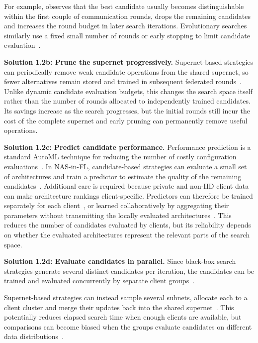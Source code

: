 For example, \cite{decnas_2022,fednas_over_hetero_mobile_devices_2022} observes that the best candidate usually becomes distinguishable within the first couple of communication rounds, drops the remaining candidates and increases the round budget in later search iterations. Evolutionary searches similarly use a fixed small number of rounds or early stopping to limit candidate evaluation~\cite{multi_objective_evo_fl_2020,gpt4-boosted_pso_fednas_2024}.

\noindent\textbf{Solution 1.2b: Prune the supernet progressively.} Supernet-based strategies can periodically remove weak candidate operations from the shared supernet, so fewer alternatives remain stored and trained in subsequent federated rounds~\cite{dfnas_2020,peaches_2024}. Unlike dynamic candidate evaluation budgets, this changes the search space itself rather than the number of rounds allocated to independently trained candidates. Its savings increase as the search progresses, but the initial rounds still incur the cost of the complete supernet and early pruning can permanently remove useful operations.

\noindent\textbf{Solution 1.2c: Predict candidate performance.} Performance prediction is a standard AutoML technique for reducing the number of costly configuration evaluations~\cite{automl_book_hpo_2019}. In NAS-in-FL, candidate-based strategies can evaluate a small set of architectures and train a predictor to estimate the quality of the remaining candidates~\cite{hapfnas_2025,energy_fednas_2025}. Additional care is required because private and non-IID client data can make architecture rankings client-specific. Predictors can therefore be trained separately for each client~\cite{hapfnas_2025}, or learned collaboratively by aggregating their parameters without transmitting the locally evaluated architectures~\cite{federated_bayesian_optimization_nas_2023}. This reduces the number of candidates evaluated by clients, but its reliability depends on whether the evaluated architectures represent the relevant parts of the search space.

\noindent\textbf{Solution 1.2d: Evaluate candidates in parallel.} Since black-box search strategies generate several distinct candidates per iteration, the candidates can be trained and evaluated concurrently by separate client groups~\cite{decnas_2022,rt_fed_evo_nas_2020,energy_fednas_2025}.

Supernet-based strategies can instead sample several subnets, allocate each to a client cluster and merge their updates back into the shared supernet~\cite{finch_2024}. This potentially reduces elapsed search time when enough clients are available, but comparisons can become biased when the groups evaluate candidates on different data distributions~\cite{decnas_2022}.

